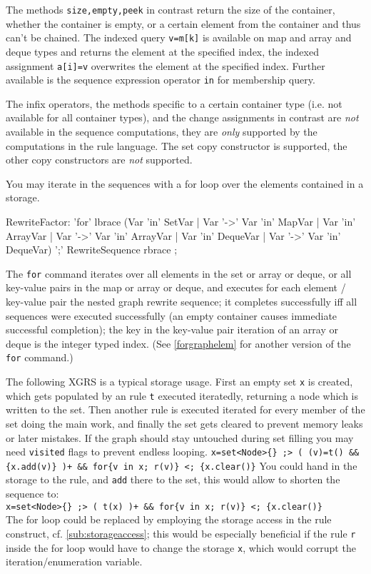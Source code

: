 The methods \texttt{size,empty,peek} in contrast return the size of the container, whether the container is empty, or a certain element from the container and thus can't be chained.
The indexed query \texttt{v=m[k]} is available on map and array and deque types and returns the element at the specified index,
the indexed assignment \texttt{a[i]=v} overwrites the element at the specified index.
Further available is the sequence expression operator \texttt{in} for membership query.

The infix operators, the methods specific to a certain container type (i.e. not available for all container types), and the change assignments in contrast are \emph{not} available in the sequence computations, they are \emph{only} supported by the computations in the rule language.
The set copy constructor is supported, the other copy constructors are \emph{not} supported.

\pagebreak

You may iterate in the sequences with a for loop over the elements contained in a storage.

\begin{rail}
  RewriteFactor:
    'for' lbrace (Var 'in' SetVar | Var '->' Var 'in' MapVar | Var 'in' ArrayVar | Var '->' Var 'in' ArrayVar | Var 'in' DequeVar | Var '->' Var 'in' DequeVar) ';' RewriteSequence rbrace
    ;
\end{rail}\label{forstorage}

The \texttt{for} command iterates over all elements in the set or array or deque, or all key-value pairs in the map or array or deque, and executes for each element / key-value pair the nested graph rewrite sequence; it completes successfully iff all sequences were executed successfully (an empty container causes immediate successful completion); the key in the key-value pair iteration of an array or deque is the integer typed index. (See \ref{forgraphelem} for another version of the \texttt{for} command.)

\begin{example}
The following XGRS is a typical storage usage.
First an empty set \texttt{x} is created, which gets populated by an rule \texttt{t} executed iteratedly, returning a node which is written to the set.
Then another rule is executed iterated for every member of the set doing the main work, and finally the set gets cleared to prevent memory leaks or later mistakes.
If the graph should stay untouched during set filling you may need \texttt{visited} flags to prevent endless looping.
\verb#x=set<Node>{} ;> ( (v)=t() && {x.add(v)} )+ && for{v in x; r(v)} <; {x.clear()}#
You could hand in the storage to the rule, and \texttt{add} there to the set, this would allow to shorten the sequence to:\\
\verb#x=set<Node>{} ;> ( t(x) )+ && for{v in x; r(v)} <; {x.clear()}#\\
The for loop could be replaced by employing the storage access in the rule construct, cf. \ref{sub:storageaccess}; this would be especially beneficial if the rule \texttt{r} inside the for loop would have to change the storage \texttt{x}, which would corrupt the iteration/enumeration variable.
\end{example}

